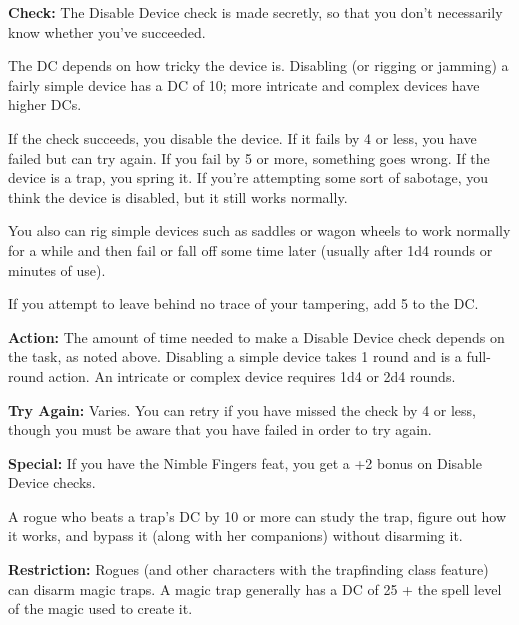 \textbf{Check:} The Disable Device check is made secretly, so that you don’t necessarily know whether you’ve succeeded.

The DC depends on how tricky the device is. Disabling (or rigging or jamming) a fairly simple device has a DC of 10; more intricate and complex devices have higher DCs.

If the check succeeds, you disable the device. If it fails by 4 or less, you have failed but can try again. If you fail by 5 or more, something goes wrong. If the device is a trap, you spring it. If you’re attempting some sort of sabotage, you think the device is disabled, but it still works normally.

You also can rig simple devices such as saddles or wagon wheels to work normally for a while and then fail or fall off some time later (usually after 1d4 rounds or minutes of use).


If you attempt to leave behind no trace of your tampering, add 5 to the DC.

\textbf{Action:} The amount of time needed to make a Disable Device check depends on the task, as noted above. Disabling a simple device takes 1 round and is a full-round action. An intricate or complex device requires 1d4 or 2d4 rounds.

\textbf{Try Again:} Varies. You can retry if you have missed the check by 4 or less, though you must be aware that you have failed in order to try again.

\textbf{Special:} If you have the Nimble Fingers feat, you get a +2 bonus on Disable Device checks.

A rogue who beats a trap’s DC by 10 or more can study the trap, figure out how it works, and bypass it (along with her companions) without disarming it.

\textbf{Restriction:} Rogues (and other characters with the trapfinding class feature) can disarm magic traps. A magic trap generally has a DC of 25 + the spell level of the magic used to create it.

